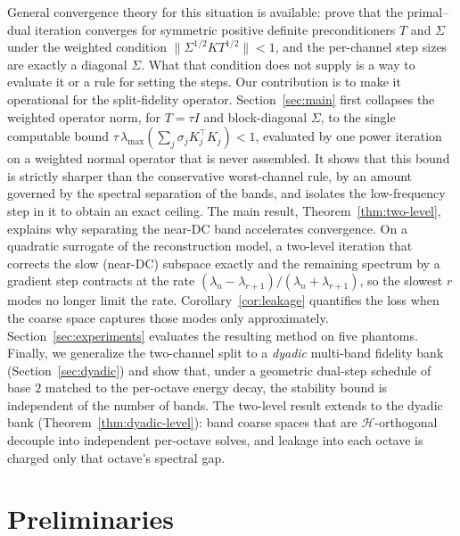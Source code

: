 \documentclass{article}
\begin{document}
General convergence theory for this situation is available: \citet{pock2011diagonal} prove that the primal--dual iteration converges for symmetric positive definite preconditioners $T$ and $\Sigma$ under the weighted condition $\|\Sigma^{1/2}KT^{1/2}\|<1$, and the per-channel step sizes are exactly a diagonal $\Sigma$. What that condition does not supply is a way to evaluate it or a rule for setting the steps. Our contribution is to make it operational for the split-fidelity operator. Section~\ref{sec:main} first collapses the weighted operator norm, for $T=\tau I$ and block-diagonal $\Sigma$, to the single computable bound $\tau\,\lambda_{\max}(\sum_j\sigma_jK_j^\top K_j)<1$, evaluated by one power iteration on a weighted normal operator that is never assembled. It shows that this bound is strictly sharper than the conservative worst-channel rule, by an amount governed by the spectral separation of the bands, and isolates the low-frequency step in it to obtain an exact ceiling. The main result, Theorem~\ref{thm:two-level}, explains why separating the near-DC band accelerates convergence. On a quadratic surrogate of the reconstruction model, a two-level iteration that corrects the slow (near-DC) subspace exactly and the remaining spectrum by a gradient step contracts at the rate $(\lambda_n-\lambda_{r+1})/(\lambda_n+\lambda_{r+1})$, so the slowest $r$ modes no longer limit the rate. Corollary~\ref{cor:leakage} quantifies the loss when the coarse space captures those modes only approximately. Section~\ref{sec:experiments} evaluates the resulting method on five phantoms. Finally, we generalize the two-channel split to a \emph{dyadic} multi-band fidelity bank (Section~\ref{sec:dyadic}) and show that, under a geometric dual-step schedule of base $2$ matched to the per-octave energy decay, the stability bound is independent of the number of bands. The two-level result extends to the dyadic bank (Theorem~\ref{thm:dyadic-level}): band coarse spaces that are $\mathcal H$-orthogonal decouple into independent per-octave solves, and leakage into each octave is charged only that octave's spectral gap.

\section{Preliminaries}
\label{sec:prelim}
\end{document}
